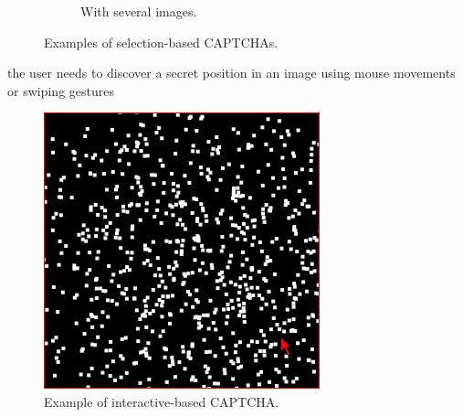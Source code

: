 \begin{itemize}
{\begin{figure}[h]
\begin{subfigure}[b]{0.48\textwidth}
         \caption{\footnotesize{With several images.}}
        \label{soa:selection2}
     \end{subfigure}
     \caption{\footnotesize{Examples of selection-based CAPTCHAs.}}
\end{figure}
}
{the user needs to discover a secret position in an image using mouse movements or swiping gestures
\begin{figure}[h]
     \centering
     \includegraphics[width=.4\linewidth]{Images/StateOfArt/interactive_CAPTCHA}
     \caption{\footnotesize{Example of interactive-based CAPTCHA.}}\label{soa:interactive_CAPTCHA}
\end{figure}
}
\end{itemize}

